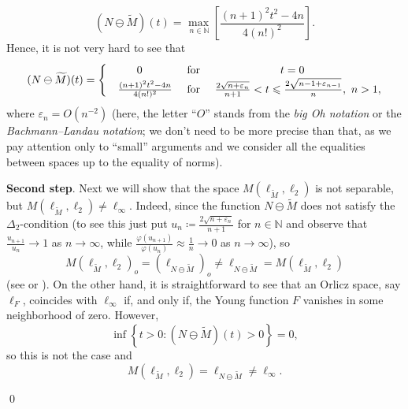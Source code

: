 \documentclass[11pt]{amsart}
\theoremstyle{definition}
\theoremstyle{definition}
\theoremstyle{definition}
\theoremstyle{definition}
\theoremstyle{definition}
\theoremstyle{definition}
\theoremstyle{definition}
\theoremstyle{definition}
\numberwithin{equation}{section}
\numberwithin{equation}{section}
\numberwithin{equation}{section}
\theoremstyle{definition}
\theoremstyle{definition}
\theoremstyle{definition}
\theoremstyle{definition}
\theoremstyle{definition}
\theoremstyle{definition}
\renewenvironment{proof}{\noindent {\bf Proof.}}{\qed}
\begin{document}
\begin{proof}
	\begin{equation*}
		( N \ominus \widetilde{M} )(t) = \max\limits_{\ n\in \mathbb{N}}\left[ \frac{(n+1)^{2}t^{2}-4n}{4(n!)^{2}} \right].
	\end{equation*}
	Hence, it is not very hard to see that
	\begin{equation*}
		( N \ominus \widetilde{M} )(t) = 
		\begin{cases}
			\hfil 0 &\text{ for } \hfil t = 0\\
			\quad \hfil \frac{(n+1)^2t^2 - 4n}{4(n!)^2}
			& \text{ for } \quad \hfil \frac{2\sqrt{n+\varepsilon_n}}{n+1} < t \leqslant \frac{2\sqrt{n-1+\varepsilon_{n-1}}}{n},\ n > 1,
		\end{cases}
	\end{equation*}
	where $\varepsilon_n = O(n^{-2})$ (here, the letter \enquote{$O$} stands from the {\it big Oh notation} or the {\it Bachmann--Landau notation};
	we don't need to be more precise than that, as we pay attention only to \enquote{small} arguments and we consider all the equalities between spaces
	up to the equality of norms).
	
	{\bf Second step}. Next we will show that the space $M(\ell_{\widetilde{M}}, \ell_2)$ is not separable, but $M(\ell_{\widetilde{M}}, \ell_2) \neq \ell_{\infty}$.
	Indeed, since the function $N \ominus \widetilde{M}$ does not satisfy the $\Delta_2$-condition (to see this just put $u_n \coloneqq\frac{2\sqrt{n+\varepsilon_n}}{n+1}$
	for $n \in \mathbb{N}$ and observe that $\frac{u_{n+1}}{u_n} \rightarrow 1$ as $n \rightarrow \infty$, while $\frac{\varphi(u_{n+1})}{\varphi(u_{n})} \approx \frac{1}{n} \rightarrow 0$
	as $n \rightarrow \infty$), so
	\begin{equation*}
		M(\ell_{\widetilde{M}}, \ell_2)_o = \left( \ell_{N \ominus \widetilde{M}} \right)_o \neq \ell_{N \ominus \widetilde{M}} = M(\ell_{\widetilde{M}}, \ell_2)
	\end{equation*}
	(see \cite[Proposition~4.a.4, p.~138]{LT77} or \cite[Corollary, pp.~21--22]{Ma89}).
	On the other hand, it is straightforward to see that an Orlicz space, say $\ell_F$, coincides with $\ell_{\infty}$ if, and only if,
	the Young function $F$ vanishes in some neighborhood of zero. However,
	\begin{equation*}
		\inf \left\{ t > 0 \colon ( N \ominus \widetilde{M} )(t) > 0 \right\} = 0,
	\end{equation*}
	so this is not the case and
	\begin{equation*}
		M(\ell_{\widetilde{M}}, \ell_2) = \ell_{N \ominus \widetilde{M}} \neq \ell_{\infty}.
	\end{equation*}
	

\end{proof}
\end{document}
